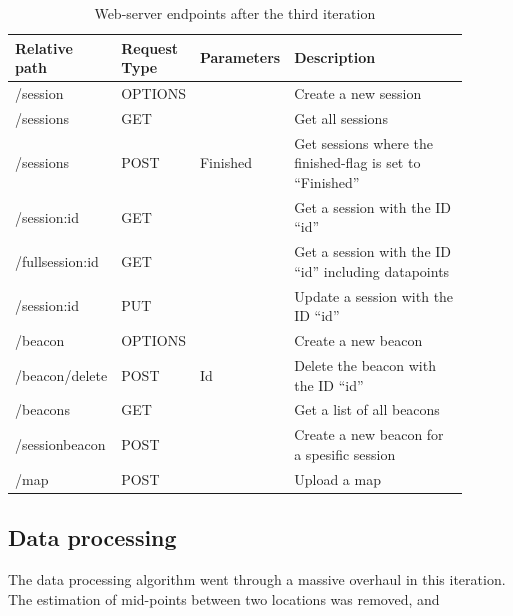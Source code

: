 \documentclass[../Main/thesis.tex]{subfiles}
\begin{document}
\begin{table}[]
\caption{Web-server endpoints after the third iteration}
\begin{tabular}{|p{0.2\linewidth}|p{0.15\linewidth}|p{0.15\linewidth}|p{0.4\linewidth}|}
\hline
\textbf{Relative path} & \textbf{Request Type} & \textbf{Parameters} & \textbf{Description}                                        \\ \hline
/session               & OPTIONS               &                     & Create a new session                                        \\ \hline
/sessions              & GET                   &                     & Get all sessions                                            \\ \hline
/sessions              & POST                  & Finished            & Get sessions where the finished-flag is set to ``Finished'' \\ \hline
/session:id            & GET                   &                     & Get a session with the ID ``id''                            \\ \hline
/fullsession:id        & GET                   &                     & Get a session with the ID ``id'' including datapoints       \\ \hline
/session:id            & PUT                   &                     & Update a session with the ID ``id''                         \\ \hline
/beacon                & OPTIONS               &                     & Create a new beacon                                         \\ \hline
/beacon/delete         & POST                  & Id                  & Delete the beacon with the ID ``id''                        \\ \hline
/beacons               & GET                   &                     & Get a list of all beacons                                   \\ \hline
/sessionbeacon         & POST                  &                     & Create a new beacon for a spesific session                  \\ \hline
/map                   & POST                  &                     & Upload a map                                                \\ \hline
\end{tabular}
\label{tab:endpoints-2}
\end{table}

\subsection{Data processing}
The data processing algorithm went through a massive overhaul in this iteration.
The estimation of mid-points between two locations was removed, and 
\end{document}
